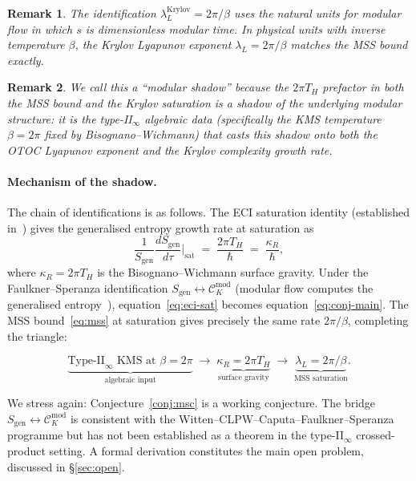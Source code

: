 \documentclass[12pt,a4paper]{article}
\newtheorem{remark}{Remark}
\begin{document}
\begin{remark}
The identification $\lambda_L^{\mathrm{Krylov}} = 2\pi/\beta$
uses the natural units for modular flow in which $s$ is dimensionless
modular time. In physical units with inverse temperature $\beta$,
the Krylov Lyapunov exponent $\lambda_L = 2\pi/\beta$ matches the
MSS bound exactly.
\end{remark}

\begin{remark}
We call this a ``modular shadow'' because the $2\pi T_H$ prefactor
in both the MSS bound and the Krylov saturation is a \emph{shadow}
of the underlying modular structure: it is the type-II$_\infty$
algebraic data (specifically the KMS temperature $\beta = 2\pi$ fixed
by Bisognano--Wichmann) that casts this shadow onto both the OTOC
Lyapunov exponent and the Krylov complexity growth rate.
\end{remark}

\paragraph{Mechanism of the shadow.}
The chain of identifications is as follows.
The ECI saturation identity (established in~\cite{ECI_v6})
gives the generalised entropy growth rate at saturation as
\begin{equation}
  \frac{1}{S_{\mathrm{gen}}} \frac{dS_{\mathrm{gen}}}{d\tau}
  \bigg|_{\mathrm{sat}}
  \;=\; \frac{2\pi T_H}{\hbar}
  \;=\; \frac{\kappa_R}{\hbar},
  \label{eq:eci-sat}
\end{equation}
where $\kappa_R = 2\pi T_H$ is the Bisognano--Wichmann surface gravity.
Under the Faulkner--Speranza identification $S_{\mathrm{gen}}
\leftrightarrow \mathcal{C}_K^{\mathrm{mod}}$ (modular flow computes
the generalised entropy~\cite{FaulknerSperanza2024}),
equation~\eqref{eq:eci-sat} becomes equation~\eqref{eq:conj-main}.
The MSS bound~\eqref{eq:mss} at saturation gives precisely the same
rate $2\pi/\beta$, completing the triangle:

\[
\underbrace{\text{Type-II}_\infty \text{ KMS at } \beta=2\pi}_{\text{algebraic input}}
\;\longrightarrow\;
\underbrace{\kappa_R = 2\pi T_H}_{\text{surface gravity}}
\;\longrightarrow\;
\underbrace{\lambda_L = 2\pi/\beta}_{\text{MSS saturation}}.
\]

We stress again: Conjecture~\ref{conj:msc} is a working conjecture.
The bridge $S_{\mathrm{gen}} \leftrightarrow \mathcal{C}_K^{\mathrm{mod}}$
is consistent with the Witten--CLPW--Caputa--Faulkner--Speranza
programme but has not been established as a theorem in the
type-II$_\infty$ crossed-product setting.
A formal derivation constitutes the main open problem, discussed in
\S\ref{sec:open}.
\end{document}
